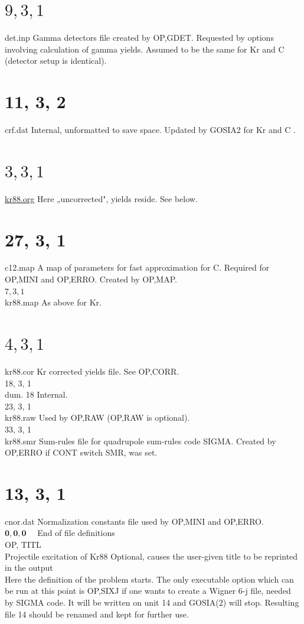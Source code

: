 \documentclass[10pt]{article}
\begin{document}
\section*{$9,3,1$}
det.inp Gamma detectors file created by OP,GDET. Requested by options involving calculation of gamma yields. Assumed to be the same for Kr and C (detector setup is identical).

\section*{11, 3, 2}
crf.dat Internal, unformatted to save space. Updated by GOSIA2 for Kr and C .

\section*{$3,3,1$}
\href{http://kr88.org}{kr88.org} Here „uncorrected", yields reside. See below.

\section*{27, 3, 1}
c12.map A map of parameters for fast approximation for C. Required for OP,MINI and OP,ERRO. Created by OP,MAP.\\
$7,3,1$\\
kr88.map As above for Kr.

\section*{$4,3,1$}
kr88.cor Kr corrected yields file. See OP,CORR.\\
18, 3, 1\\
dum. 18 Internal.\\
23, 3, 1\\
kr88.raw Used by OP,RAW (OP,RAW is optional).\\
33, 3, 1\\
kr88.smr Sum-rules file for quadrupole sum-rules code SIGMA. Created by OP,ERRO if CONT switch SMR, was set.

\section*{13, 3, 1}
cnor.dat Normalization constants file used by OP,MINI and OP,ERRO.\\
$\mathbf{0}, \mathbf{0}, \mathbf{0} \quad$ End of file definitions\\
OP, TITL\\
Projectile excitation of Kr88 Optional, causes the user-given title to be reprinted in the output\\
Here the definition of the problem starts. The only executable option which can be run at this point is OP,SIXJ if one wants to create a Wigner 6-j file, needed by SIGMA code. It will be written on unit 14 and GOSIA(2) will stop. Resulting file 14 should be renamed and kept for further use.
\end{document}
